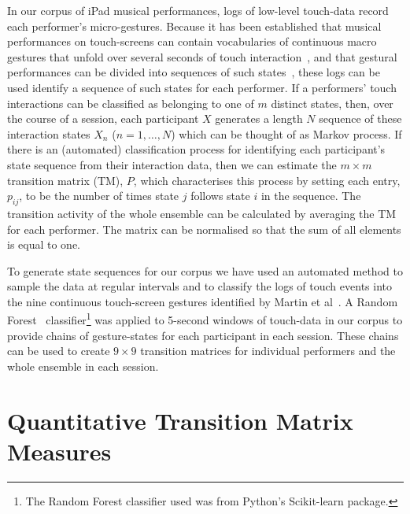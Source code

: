 \documentclass{sigchi}
\begin{document}
In our corpus of iPad musical performances, logs of low-level touch-data record each performer's micro-gestures. 
Because it has been
established that musical performances on touch-screens can contain 
vocabularies of continuous macro gestures that unfold over
several seconds of touch interaction~\cite{Martin:2014cr}, and that
gestural performances can be divided into sequences of such states~\cite{Pressing:1988uo}, these logs
 can be used identify a sequence of such states for each performer.
If a performers' touch interactions can be classified as belonging
to one of $m$ distinct states, then, over the course of a session, each
participant $X$ generates a length $N$ sequence of these interaction
states $X_n$ ($n = 1, \ldots, N$) which can be thought of as Markov
process.
If there is an (automated) classification process for identifying each
participant's state sequence from their interaction data, then we can
estimate the $m \times m$ transition matrix (TM), $P$, which characterises
this process by setting each entry, $p_{ij}$, to be the number of times
state $j$ follows state $i$ in the sequence. The transition activity
of the whole ensemble can be calculated by averaging the TM for each
performer. The matrix can be normalised so that the sum of all
elements is equal to one.

To generate state sequences for our corpus we have used an automated
method to sample the data at regular intervals and to classify the logs of touch events
into the nine continuous touch-screen gestures identified by Martin et
al~\cite{Martin:2015jk}. A Random Forest~\cite{Breiman:2001kx}
classifier\footnote{The Random Forest classifier used was from
  Python's Scikit-learn package\cite{scikit-learn}.} was applied to
5-second windows of touch-data in our corpus to provide chains of
gesture-states for each participant in each session. These chains can
be used to create $9 \times 9$ transition matrices for individual
performers and the whole ensemble in each session.

\section{Quantitative Transition Matrix Measures}
\label{sec:underst-impr-group}
\end{document}
